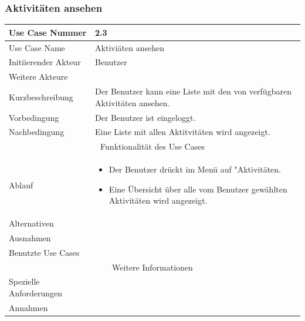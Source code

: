 \documentclass[10pt,a4paper]{article}
\begin{document}
\subsubsection{Aktivit\"aten ansehen}
	\begin{tabularx}{\textwidth}{|l|X|}
	\hline Use Case Nummer & 2.3 \\ 
	\hline Use Case Name & Aktivi\"aten ansehen \\ 
	\hline Initiierender Akteur & Benutzer \\
	\hline Weitere Akteure &  \\
	\hline Kurzbeschreibung & Der Benutzer kann eine Liste mit den von verf\"ugbaren Aktivit\"aten ansehen. \\
	\hline Vorbedingung & Der Benutzer ist eingeloggt. \\
	\hline Nachbedingung & Eine Liste mit allen Aktitvitäten wird angezeigt. \\
	\hline \multicolumn{2}{|c|}{Funktionalität des Use Cases}\\
	\hline Ablauf & \begin{itemize}
		\item Der Benutzer drückt im Menü auf "Aktivit\"aten.
		\item Eine Übersicht über alle vom Benutzer gewählten Aktivit\"aten wird angezeigt.
	\end{itemize} \\
	\hline Alternativen &  \\
	\hline Ausnahmen &  \\
	\hline Benutzte Use Cases &  \\
	\hline \multicolumn{2}{|c|}{Weitere Informationen} \\
	\hline Spezielle Anforderungen &  \\
	\hline Annahmen &  \\
	\hline
	\end{tabularx}
\end{document}
